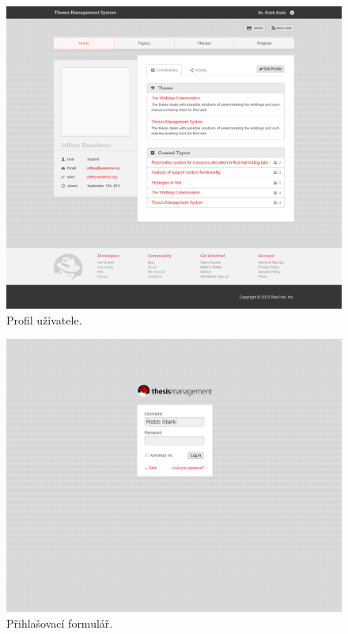 \begin{figure}[htbp]
    \centering
    \includegraphics[width=\textwidth]{images/gd3.png}
    \caption{Profil uživatele.}
    \label{img:layout1}
\end{figure}

\begin{figure}[htbp]
    \centering
    \includegraphics[width=\textwidth]{images/gd4.png}
    \caption{Přihlašovací formulář.}
    \label{img:layout1}
\end{figure}

